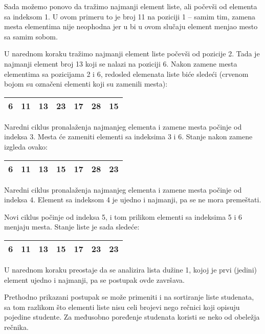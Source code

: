 \documentclass[a4paper]{article}
\begin{document}
Sada možemo ponovo da tražimo najmanji element liste, ali počevši od elementa sa
indeksom 1. U ovom primeru to je broj 11 na poziciji 1 -- samim tim, zamena
mesta elementima nije neophodna jer u bi u ovom slučaju element menjao mesto sa
samim sobom.

U narednom koraku tražimo najmanji element liste počevši od pozicije 2. Tada je
najmanji element broj 13 koji se nalazi na poziciji 6. Nakon zamene mesta
elementima sa pozicijama 2 i 6, redosled elemenata liste biće sledeći (crvenom
bojom su označeni elementi koji su zamenili mesta):

\begin{center}
\begin{tabular}{|c|c|c|c|c|c|c|} \hline
6 & 11 & \color{red}13 & 23 & 17 & 28 & \color{red}15 \\ \hline
\end{tabular}
\end{center}

Naredni ciklus pronalaženja najmanjeg elementa i zamene mesta počinje od indeksa
3. Mesta će zameniti elementi sa indeksima 3 i 6. Stanje nakon zamene izgleda
ovako:

\begin{center}
\begin{tabular}{|c|c|c|c|c|c|c|} \hline
6 & 11 & 13 & \color{red}15 & 17 & 28 & \color{red}23 \\ \hline
\end{tabular}
\end{center}

Naredni ciklus pronalaženja najmanjeg elementa i zamene mesta počinje od indeksa
4. Element sa indeksom 4 je ujedno i najmanji, pa se ne mora premeštati.

Novi ciklus počinje od indeksa 5, i tom prilikom elementi sa indeksima 5 i 6
menjaju mesta. Stanje liste je sada sledeće:

\begin{center}
\begin{tabular}{|c|c|c|c|c|c|c|} \hline
6 & 11 & 13 & 15 & 17 & \color{red}23 & \color{red}23 \\ \hline
\end{tabular}
\end{center}

U narednom koraku preostaje da se analizira lista dužine 1, kojoj je prvi
(jedini) element ujedno i najmanji, pa se postupak ovde završava.

Prethodno prikazani postupak se može primeniti i na sortiranje liste studenata,
sa tom razlikom što elementi liste nisu celi brojevi nego rečnici koji opisuju
pojedine studente. Za međusobno poređenje studenata koristi se neko od obeležja
rečnika.
\end{document}
